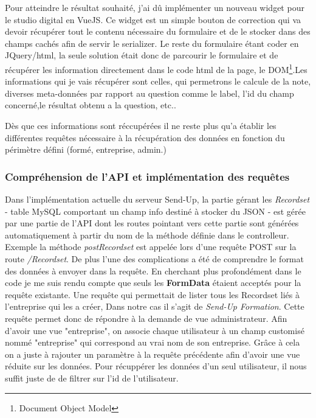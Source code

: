 Pour atteindre le résultat souhaité, j'ai dû implémenter un nouveau widget pour le studio digital en VueJS. Ce widget est un simple bouton de correction qui va devoir récupérer tout le contenu nécessaire du formulaire et de le stocker dans des champs cachés afin de servir le serializer. Le reste du formulaire étant coder en JQuery/html, la seule solution était donc de parcourir le formulaire et de récupérer les information directement dans le code html de la page, le DOM\footnote{Document Object Model}.Les informations qui je vais récupérer sont celles, qui permetrons le calcule de la note, diverses meta-données par rapport au question comme le label, l'id du champ concerné,le résultat obtenu a la question, etc.. 

Dès que ces informations sont réccupérées il ne reste plus qu'a établir les différentes requêtes nécessaire à la récupération des données en fonction du périmètre défini (formé, entreprise, admin.)


\subsubsection{Compréhension de l'API et implémentation des requêtes}

Dans l'implémentation actuelle du serveur Send-Up, la partie gérant les \textit{Recordset} - table MySQL comportant un champ info destiné à stocker du JSON - est gérée par une partie de l'API dont les routes pointant vers cette partie sont générées automatiquement à partir du nom de la méthode définie dans le controlleur. Exemple la méthode \textit{postRecordset} est appelée lors d'une requête POST sur la route \textit{/Recordset}. De plus l'une des complications a été de comprendre le format des données à envoyer dans la requête. En cherchant plus profondément dans le code je me suis rendu compte que seuls les \textbf{FormData} étaient acceptés pour la requête existante.
Une requête qui permettait de lister tous les Recordset liés à l'entreprise qui les a créer, Dans notre cas il s'agit de \textit{Send-Up Formation}. Cette requête permet donc de répondre à la demande de vue administrateur. Afin d'avoir une vue "entreprise", on associe chaque utilisateur à  un champ customisé nommé "entreprise" qui correspond au vrai nom de son entreprise. Grâce à cela on a juste à rajouter un paramètre à la requête précédente afin d'avoir une vue réduite sur les données. 
Pour récuppérer les données d'un seul utilisateur, il nous suffit juste de de filtrer sur l'id de l'utilisateur.   


